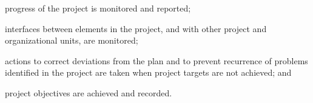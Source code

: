 			\begin{adjustwidth}{2em}{0pt}

				\begin{compactitem}

					\item progress of the project is monitored and reported;

					\item interfaces between elements in the project, and with other project and organizational units, are monitored;

					\item actions to correct deviations from the plan and to prevent recurrence of problems identified in the project are taken when project targets are not achieved; and

					\item project objectives are achieved and recorded.

				\end{compactitem}

			\end{adjustwidth}

